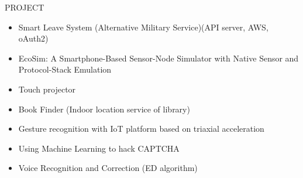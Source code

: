 \documentclass{res}
\makeatletter
\renewcommand{\section}{\@startsection{section}{1}{0mm}
  {-\baselineskip}{0.5\baselineskip}{\bf\leftline}}
\makeatother
\begin{document}
\begin{resume}
			\vspace{-0.1in}
			\section{PROJECT}
			\vspace{-0.1in}
			\begin{itemize}[leftmargin=*]

					\item Smart Leave System (Alternative Military Service)(API server, AWS, oAuth2) 
					\vspace{-0.05in}
					
					\item EcoSim: A Smartphone-Based Sensor-Node Simulator with Native Sensor and Protocol-Stack Emulation
					\vspace{-0.05in}

					\item Touch projector
					\vspace{-0.05in}
					
					\item Book Finder (Indoor location service of library)
					\vspace{-0.05in}
					
					\item Gesture recognition with IoT platform based on triaxial acceleration
					\vspace{-0.05in}
					
					\item Using Machine Learning to hack CAPTCHA	
					\vspace{-0.05in}
					
					\item Voice Recognition and Correction (ED algorithm)
					\vspace{-0.05in}


			\end{itemize}
			
				          
		\end{resume}
	
\end{document}
